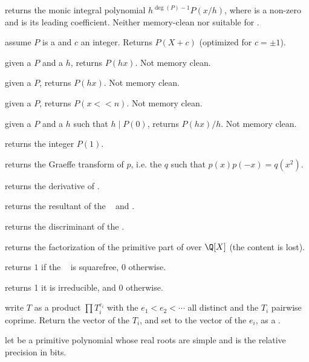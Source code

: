  returns the monic integral polynomial
$h^{\deg(P)-1} P(x/h)$, where  is a non-zero  and  is
its leading coefficient. Neither memory-clean nor suitable for
.

 assume $P$ is a  and $c$ an
integer. Returns $P(X + c)$ (optimized for $c = \pm 1$).

 given a  $P$ and a  $h$,
returns $P(hx)$. Not memory clean.

 given a  $P$,
returns $P(hx)$. Not memory clean.

 given a  $P$, returns
$P(x<<n)$. Not memory clean.

 given a  $P$ and a  $h$
such that $h \mid P(0)$, returns $P(hx)/h$. Not memory clean.

 returns the integer $P(1)$.

 returns the Graeffe transform of $p$, i.e. the
 $q$ such that $p(x)p(-x) = q(x^2)$.

 returns the derivative of .

 returns the resultant of the
~ and .

 returns the discriminant of the 
.

 returns the factorization of the primitive part
of  over $\Q[X]$ (the content is lost).

 returns $1$ if the
~ is squarefree, $0$ otherwise.

 returns 1 it  is irreducible, and
0 otherwise.

 write $T$ as a product $\prod T_i^{e_i}$
with the $e_1 < e_2 < \cdots$ all distinct and the $T_i$ pairwise coprime.
Return the vector of the $T_i$, and set  to the vector of the $e_i$,
as a .

 let  be a
primitive  polynomial whose real roots are simple and  is
the relative precision in bits.

